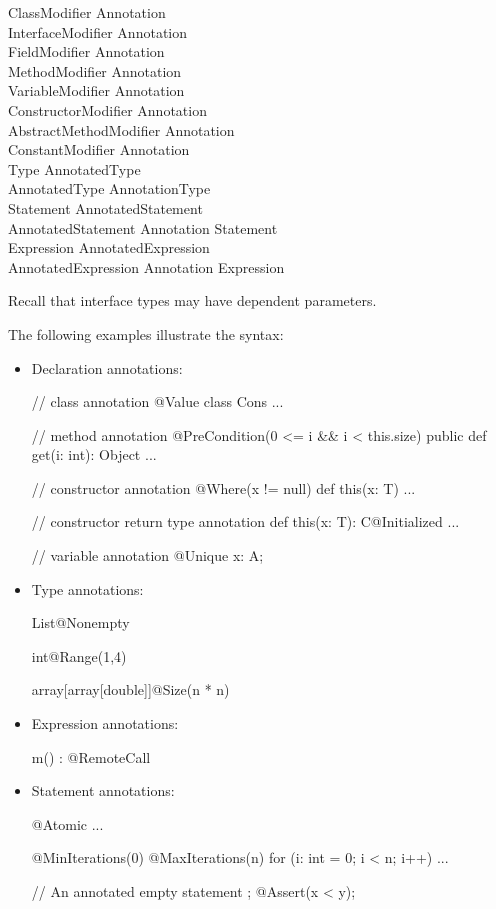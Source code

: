 \begin{grammar}
ClassModifier \: Annotation \\
InterfaceModifier \: Annotation \\
FieldModifier \: Annotation \\
MethodModifier \: Annotation \\
VariableModifier \: Annotation \\
ConstructorModifier \: Annotation \\
AbstractMethodModifier \: Annotation \\
ConstantModifier \: Annotation \\
Type \: AnnotatedType \\
AnnotatedType \: Annotation\plus Type \\
Statement \: AnnotatedStatement \\
AnnotatedStatement \: Annotation Statement \\
Expression \: AnnotatedExpression \\
AnnotatedExpression \: Annotation Expression \\
\end{grammar}

\noindent
Recall that interface types may have dependent parameters.

\noindent
The following examples illustrate the syntax:

\begin{itemize}
\item Declaration annotations:
\begin{xtennoindent}
  // class annotation
  @Value
  class Cons { ... }

  // method annotation
  @PreCondition(0 <= i && i < this.size)
  public def get(i: int): Object { ... }

  // constructor annotation
  @Where(x != null)
  def this(x: T) { ... }

  // constructor return type annotation
  def this(x: T): C@Initialized { ... }

  // variable annotation
  @Unique x: A;
\end{xtennoindent}
\item Type annotations:
\begin{xtennoindent}
  List@Nonempty

  int@Range(1,4)

  array[array[double]]@Size(n * n)
\end{xtennoindent}
\item Expression annotations:
\begin{xtennoindent}
  m() : @RemoteCall
\end{xtennoindent}
\item Statement annotations:
\begin{xtennoindent}
  @Atomic { ... }

  @MinIterations(0)
  @MaxIterations(n)
  for (i: int = 0; i < n; i++) { ... }

  // An annotated empty statement ;
  @Assert(x < y);
\end{xtennoindent}
\end{itemize}

